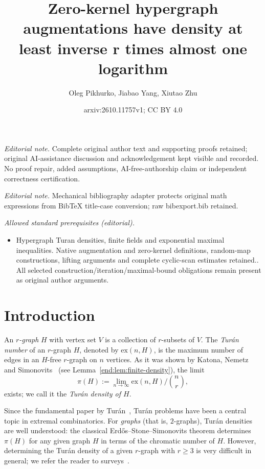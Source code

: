 \documentclass[10pt,a4paper]{article}
\title{Zero-kernel hypergraph augmentations have density at least inverse r times almost one logarithm}
\author{Oleg Pikhurko, Jiabao Yang, Xiutao Zhu}
\date{arxiv:2610.11757v1; CC BY 4.0}
\numberwithin{equation}{section}
\theoremstyle{definition}
\theoremstyle{remark}
\begin{document}
\maketitle
\noindent\textit{Editorial note.} Complete original author text and supporting proofs retained; original AI-assistance discussion and acknowledgement kept visible and recorded. No proof repair, added assumptions, AI-free-authorship claim or independent correctness certification.\par\medskip
\noindent\textit{Editorial note.} Mechanical bibliography adapter protects original math expressions from BibTeX title-case conversion; raw bibexport.bib retained.\par\medskip
\noindent\textit{Allowed standard prerequisites (editorial).}\begin{itemize}
\item Hypergraph Turan densities, finite fields and exponential maximal inequalities. Native augmentation and zero-kernel definitions, random-map constructions, lifting arguments and complete cyclic-scan estimates retained.. All selected construction/iteration/maximal-bound obligations remain present as original author arguments.
\end{itemize}\medskip
\section{Introduction}

An \emph{$r$-graph} $H$ with vertex set $V$ is a collection of $r$-subsets of $V$. The {\em Tur\'{a}n number} of an $r$-graph $H$, denoted by $\mathrm{ex}(n,H)$, is the maximum number of edges in an $H$-free $r$-graph on $n$ vertices. 
As it was shown by Katona, Nemetz and Simonovits~\cite{KatonaNemetzSimonovits64} (see Lemma~\ref{end:lem:finite-density}), the limit
\[
\pi(H):=\lim_{n\to\infty} \mathrm{ex}(n,H)/\binom {n}{r},
\]
 exists; we call it the \emph{Tur\'an density of $H$}.

Since the fundamental paper by Tur\'an~\cite{Turan41}, Tur\'an problems have been a central topic in extremal combinatorics. For \emph{graphs} (that is, $2$-graphs), Tur\'an densities are well understood: the classical Erd\H{o}s--Stone--Simonovits theorem \cite{ErdosStone46,ErdosSimonovits66} determines $\pi(H)$ for any given graph $H$ in terms of the chromatic number of $H$. However, determining the Tur\'an density of a given $r$-graph with $r\ge 3$ is very difficult in general; we refer the reader to surveys~\cite{Furedi91,Decaen94,Sidorenko95,Keevash11}. 
\end{document}
